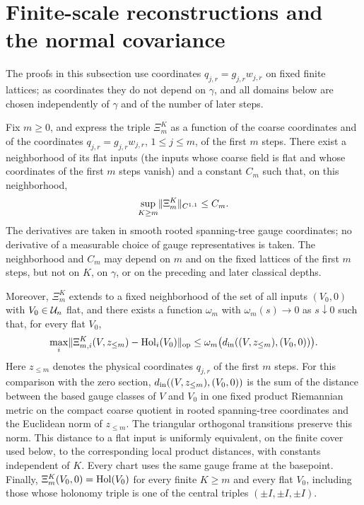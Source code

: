 \section{Finite-scale reconstructions and the normal covariance}\label{ch31:sec:covariance}

The proofs in this subsection use coordinates $q_{j,r}=g_{j,r}w_{j,r}$ on fixed finite lattices; as coordinates they do not depend on $\gamma$, and all domains below are chosen independently of $\gamma$ and of the number of later steps.

\begin{theorem}\label{ch31:thm:prefix-regularity}
Fix $m\ge0$, and express the triple $\Xi_m^K$ as a function of the coarse coordinates and of the coordinates $q_{j,r}=g_{j,r}w_{j,r}$, $1\le j\le m$, of the first $m$ steps. There exist a neighborhood of its flat inputs (the inputs whose coarse field is flat and whose coordinates of the first $m$ steps vanish) and a constant $C_m$ such that, on this neighborhood,
\[
 \sup_{K\ge m}\lVert \Xi_m^K\rVert_{C^{1,1}}\le C_m.
\]
The derivatives are taken in smooth rooted spanning-tree gauge coordinates; no derivative of a measurable choice of gauge representatives is taken. The neighborhood and $C_m$ may depend on $m$ and on the fixed lattices of the first $m$ steps, but not on $K$, on $\gamma$, or on the preceding and later classical depths.

Moreover, $\Xi_m^K$ extends to a fixed neighborhood of the set of all inputs $(V_0,0)$ with $V_0\in\mathcal U_{n}$ flat, and there exists a function $\omega_m$ with $\omega_m(s)\to0$ as $s\downarrow0$ such that, for every flat $V_0$,
\[
 \max_i\lVert \Xi_{m,i}^K(V,z_{\le m})-\operatorname{Hol}_i(V_0)\rVert_{\rm op}\le\omega_m\bigl(d_{\rm in}((V,z_{\le m}),(V_0,0))\bigr).
\]
Here $z_{\le m}$ denotes the physical coordinates $q_{j,r}$ of the first $m$ steps. For this comparison with the zero section, $d_{\rm in}((V,z_{\le m}),(V_0,0))$ is the sum of the distance between the based gauge classes of $V$ and $V_0$ in one fixed product Riemannian metric on the compact coarse quotient in rooted spanning-tree coordinates and the Euclidean norm of $z_{\le m}$. The triangular orthogonal transitions preserve this norm. This distance to a flat input is uniformly equivalent, on the finite cover used below, to the corresponding local product distances, with constants independent of $K$. Every chart uses the same gauge frame at the basepoint. Finally, $\Xi_m^K(V_0,0)=\operatorname{Hol}(V_0)$ for every finite $K\ge m$ and every flat $V_0$, including those whose holonomy triple is one of the central triples $(\pm I,\pm I,\pm I)$.
\end{theorem}

